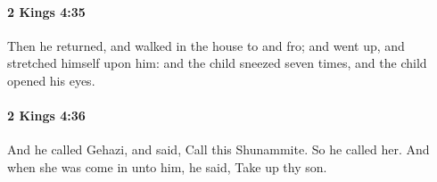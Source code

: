 		\paragraph{2 Kings 4:35} %
			\label{2KINGS-4-35}

			Then he returned, and walked in the house to and fro; and went up, and stretched himself upon him: and the child sneezed seven times, and the child opened his eyes.


		\paragraph{2 Kings 4:36} %
			\label{2KINGS-4-36}

			And he called Gehazi, and said, Call this Shunammite. So he called her. And when she was come in unto him, he said, Take up thy son.


